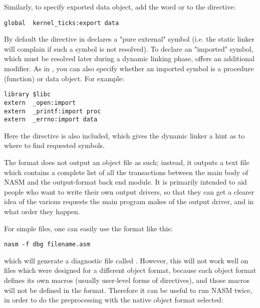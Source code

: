 Similarly, to specify exported data object, add the word 
or  to the directive:

\begin{lstlisting}
global  kernel_ticks:export data
\end{lstlisting}


By default the  directive in  declares a "pure external"
symbol (i.e. the static linker will complain if such a symbol is not resolved).
To declare an "imported" symbol, which must be resolved later during a dynamic
linking phase,  offers an additional  modifier. As in
, you can also specify whether an imported symbol is a procedure
(function) or data object. For example:

\begin{lstlisting}
library $libc
extern  _open:import
extern  _printf:import proc
extern  _errno:import data
\end{lstlisting}

Here the directive  is also included, which gives the dynamic linker
a hint as to where to find requested symbols.


The  format does not output an object file as such; instead,
it outputs a text file which contains a complete list of all the
transactions between the main body of NASM and the output-format
back end module. It is primarily intended to aid people who want to
write their own output drivers, so that they can get a clearer idea
of the various requests the main program makes of the output driver,
and in what order they happen.

For simple files, one can easily use the  format like this:

\begin{lstlisting}
nasm -f dbg filename.asm
\end{lstlisting}

which will generate a diagnostic file called .
However, this will not work well on files which were designed for a
different object format, because each object format defines its own
macros (usually user-level forms of directives), and those macros
will not be defined in the  format. Therefore it can be
useful to run NASM twice, in order to do the preprocessing with the
native object format selected:

